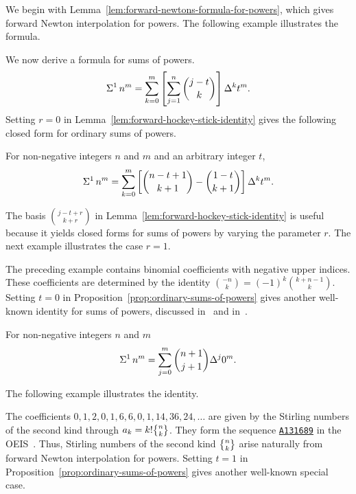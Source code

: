 We begin with Lemma~\eqref{lem:forward-newtons-formula-for-powers}, which gives forward Newton interpolation for powers. The following example illustrates the formula.

We now derive a formula for sums of powers.
\begin{align*}
  \Sigma^{1}\,{n}^{m}
  = \sum_{k=0}^{m} \left[ \sum_{j=1}^{n} \binom{j-t}{k} \right] \Delta^{k} t^m.
\end{align*}
Setting $r=0$ in Lemma~\eqref{lem:forward-hockey-stick-identity} gives the following closed form for ordinary sums of powers.
\begin{proposition}
  \label{prop:ordinary-sums-of-powers}
  For non-negative integers $n$ and $m$ and an arbitrary integer $t$,
  \begin{align*}
    \Sigma^{1}\,{n}^{m}
    = \sum_{k=0}^{m} \left[ \binom{n-t+1}{k+1} - \binom{1-t}{k+1} \right] \Delta^{k} t^m.
  \end{align*}
\end{proposition}
The basis $\binom{j-t+r}{k+r}$ in Lemma~\eqref{lem:forward-hockey-stick-identity} is useful because it yields closed forms for sums of powers by varying the parameter $r$. The next example illustrates the case $r=1$.

The preceding example contains binomial coefficients with negative upper indices. These coefficients are determined by the identity $\binom{-n}{k} = (-1)^{k} \binom{k+n-1}{k}$. Setting $t=0$ in Proposition~\eqref{prop:ordinary-sums-of-powers} gives another well-known identity for sums of powers, discussed in~\cite[p. 190]{graham1994concrete} and in~\cite{pfaff2007deriving}.
\begin{corollary}
  For non-negative integers $n$ and $m$
  \begin{align*}
    \Sigma^{1}\,{n}^{m} = \sum_{j=0}^{m} \binom{n+1}{j+1} \Delta^{j} 0^m.
  \end{align*}
\end{corollary}
The following example illustrates the identity.

The coefficients $0,1,2,0,1,6,6,0,1,14,36,24,\dots$ are given by the Stirling numbers of the second kind through $a_k = k! \stirlingii{n}{k}$. They form the sequence
\href{https://oeis.org/A131689}{\texttt{A131689}}
in the OEIS~\cite{sloane2003line}.
Thus, Stirling numbers of the second kind $\stirlingii{n}{k}$ arise naturally from forward Newton interpolation for powers. Setting $t=1$ in Proposition~\eqref{prop:ordinary-sums-of-powers} gives another well-known special case.
